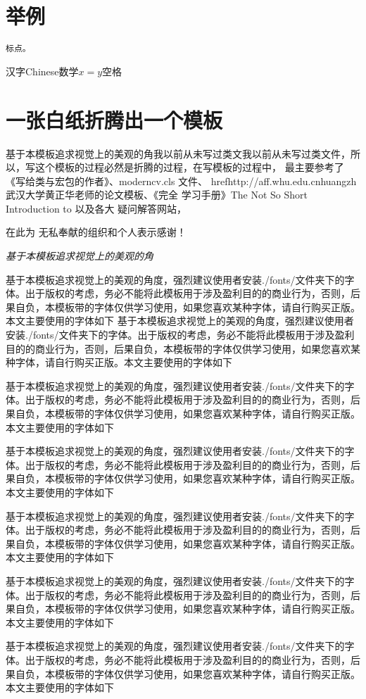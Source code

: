 \documentclass[12pt]{article}
\begin{document}
\fontsize{15.75pt}{30mm}
\section{举例}
\begin{verbatim}
标点。
\end{verbatim}
汉字Chinese数学$x=y$空格

\section{一张白纸折腾出一个模板}


    基于本模板追求视觉上的美观的角我以前从未写过类文我以前从未写过类文件，所以，写这个模板的过程必然是折腾的过程，在写模板的过程中，
最主要参考了《写给\LaTeXe 类与宏包的作者》、moderncv.cls 文件、
href{http://aff.whu.edu.cnhuangzh}{武汉大学黄正华老师的论文模板}、《\LaTeXe 完全
学习手册》The Not So Short Introduction to \LaTeXe 以及各大 疑问解答网站，

\textsf{\huge{}在此为
无私奉献的组织和个人表示感谢！}

\emph{基于本模板追求视觉上的美观的角}

基于本模板追求视觉上的美观的角度，强烈建议使用者安装./fonts/文件夹下的字体。出于版权的考虑，务必不能将此模板用于涉及盈利目的的商业行为，否则，后果自负，本模板带的字体仅供学习使用，如果您喜欢某种字体，请自行购买正版。本文主要使用的字体如下
基于本模板追求视觉上的美观的角度，强烈建议使用者安装./fonts/文件夹下的字体。出于版权的考虑，务必不能将此模板用于涉及盈利目的的商业行为，否则，后果自负，本模板带的字体仅供学习使用，如果您喜欢某种字体，请自行购买正版。本文主要使用的字体如下

基于本模板追求视觉上的美观的角度，强烈建议使用者安装./fonts/文件夹下的字体。出于版权的考虑，务必不能将此模板用于涉及盈利目的的商业行为，否则，后果自负，本模板带的字体仅供学习使用，如果您喜欢某种字体，请自行购买正版。本文主要使用的字体如下

基于本模板追求视觉上的美观的角度，强烈建议使用者安装./fonts/文件夹下的字体。出于版权的考虑，务必不能将此模板用于涉及盈利目的的商业行为，否则，后果自负，本模板带的字体仅供学习使用，如果您喜欢某种字体，请自行购买正版。本文主要使用的字体如下

基于本模板追求视觉上的美观的角度，强烈建议使用者安装./fonts/文件夹下的字体。出于版权的考虑，务必不能将此模板用于涉及盈利目的的商业行为，否则，后果自负，本模板带的字体仅供学习使用，如果您喜欢某种字体，请自行购买正版。本文主要使用的字体如下

基于本模板追求视觉上的美观的角度，强烈建议使用者安装./fonts/文件夹下的字体。出于版权的考虑，务必不能将此模板用于涉及盈利目的的商业行为，否则，后果自负，本模板带的字体仅供学习使用，如果您喜欢某种字体，请自行购买正版。本文主要使用的字体如下

基于本模板追求视觉上的美观的角度，强烈建议使用者安装./fonts/文件夹下的字体。出于版权的考虑，务必不能将此模板用于涉及盈利目的的商业行为，否则，后果自负，本模板带的字体仅供学习使用，如果您喜欢某种字体，请自行购买正版。本文主要使用的字体如下
\end{document}
